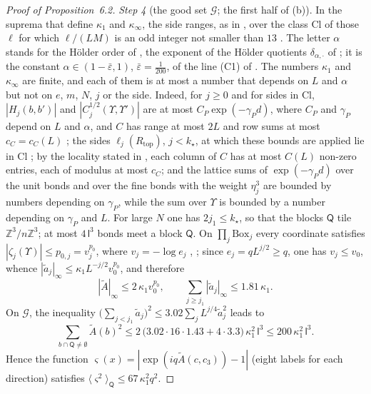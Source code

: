 \documentclass[11pt,letterpaper,reqno]{amsart}
\theoremstyle{definition}
\begin{document}
\begin{proof}[Proof of Proposition~6.2]
\emph{Step 4} (the good set $\mathcal G$; the first half of (b)).
In the suprema that define $\kappa_1$ and $\kappa_\infty$, the side ranges, as in \cite[Section~I.1.1]{QEDIII}, over the class $\mathrm{Cl}$ of those $\ell$ for which $\ell/(LM)$ is an odd integer not smaller than $13$ \cite[Section~5.2.3]{QEDI}.
The letter $\alpha$ stands for the H\"older order of \cite[Section~2.7]{QEDI}, the exponent of the H\"older quotients $\delta_{\alpha,\cdot}$ of \cite[(I.1.7)]{QEDIII};
it is the constant $\alpha\in(1-\bar\varepsilon,1)$, $\bar\varepsilon=\frac1{200}$, of the line (C1) of \cite[Section~I.8.2]{QEDIII}.
The numbers $\kappa_1$ and $\kappa_\infty$ are finite, and each of them is at most a number that depends on $L$ and $\alpha$ but not on $e$, $m$, $N$, $j$ or the side.
Indeed, for $j\ge0$ and for sides in $\mathrm{Cl}$, $|H_j(b,b')|$ and $|C_j^{1/2}(\Upsilon,\Upsilon')|$ are at most $C_P\exp(-\gamma_Pd)$, where $C_P$ and $\gamma_P$ depend on $L$ and $\alpha$, and $C$ has range at most $2L$ and row sums at most $c_C=c_C(L)$ \cite[Section~5.4, Propositions~5.32, 5.34, 5.35]{QEDI};
the sides $\ell_j(R_{\mathrm{top}})$, $j<k_\star$, at which these bounds are applied lie in $\mathrm{Cl}$ \cite[Section~G4.0.2, (Sc4)]{QEDIII};
by the locality stated in \cite[Proposition~5.35]{QEDI}, each column of $C$ has at most $C(L)$ non-zero entries, each of modulus at most $c_C$;
and the lattice sums of $\exp(-\gamma_Pd)$ over the unit bonds and over the fine bonds with the weight $\eta_j^3$ are bounded by numbers depending on $\gamma_P$, while the sum over $\Upsilon$ is bounded by a number depending on $\gamma_P$ and $L$.
For large $N$ one has $2j_1\le k_\star$, so that the blocks $\mathsf Q$ tile $\mathbb Z^3/n\mathbb Z^3$;
at most $4\,\mathsf l^3$ bonds meet a block $\mathsf Q$.
On $\prod_j\mathrm{Box}_j$ every coordinate satisfies $|\zeta_j(\Upsilon)|\le p_{0,j}=v_j^{p_0}$, where $v_j=-\log e_j$ \cite[Section~5.2.5]{QEDI}, \cite[Section~I.6.1]{QEDIII};
since $e_j=qL^{j/2}\ge q$, one has $v_j\le v_0$, whence $|\tilde a_j|_\infty\le\kappa_1L^{-j/2}v_0^{p_0}$, and therefore
\begin{equation*}
|\tilde A|_\infty\le2\,\kappa_1v_0^{p_0},\qquad\sum_{j\ge j_1}|\tilde a_j|_\infty\le1.81\,\kappa_1 .
\end{equation*}
On $\mathcal G$, the inequality $\bigl(\sum_{j<j_1}\tilde a_j\bigr)^2\le3.02\sum_jL^{j/4}\tilde a_j^2$ leads to
\begin{equation*}
\sum_{b\cap\mathsf Q\ne\emptyset}\tilde A(b)^2\le2\,\bigl(3.02\cdot16\cdot1.43+4\cdot3.3\bigr)\,\kappa_1^2\,\mathsf l^3\le200\,\kappa_1^2\,\mathsf l^3 .
\end{equation*}
Hence the function $\varsigma(x)=|\exp(iq\tilde A(c,c_3))-1|$ (eight labels for each direction) satisfies $\langle\varsigma^2\rangle_{\mathsf Q}\le67\,\kappa_1^2q^2$.


\end{proof}
\end{document}
